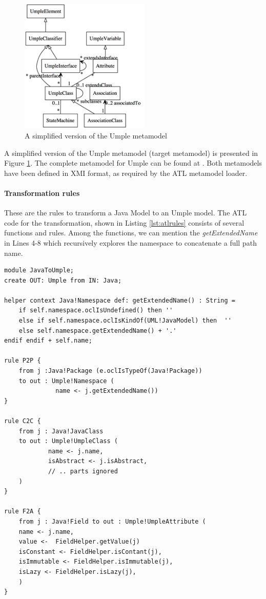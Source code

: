 \begin{figure}[h!]
\centering
\includegraphics[width=0.55\textwidth]{Figures/umpleMetamodel.png} 
\caption{A simplified version of the Umple metamodel}
\label{fig:umplemodelatl}
\end{figure}
A simplified version of the Umple metamodel (target metamodel) is presented in Figure \ref{fig:umplemodelatl}. The complete metamodel for Umple can be found at \cite{UmpleMetamodel}. Both metamodels have been defined in XMI format, as required by the ATL metamodel loader.

\paragraph{Transformation rules} 

These are the rules to transform a Java Model to an Umple model. The ATL code for the transformation, shown in Listing \ref{lst:atlrules} consists of several functions and rules. Among the functions, we can mention the \textit{getExtendedName} in Lines 4-8 which recursively explores the namespace to concatenate a full path name.


\begin{lstlisting}[style=atl, label=lst:atlrules, caption=ATL Transformation rules]
module JavaToUmple;
create OUT: Umple from IN: Java;

helper context Java!Namespace def: getExtendedName() : String = 
	if self.namespace.oclIsUndefined() then '' 	
	else if self.namespace.oclIsKindOf(UML!JavaModel) then 	'' 
	else self.namespace.getExtendedName() + '.'
endif endif + self.name;

rule P2P { 
	from j :Java!Package (e.oclIsTypeOf(Java!Package)) 	
	to out : Umple!Namespace ( 		
			  name <- j.getExtendedName())
}

rule C2C { 	
	from j : Java!JavaClass 	
	to out : Umple!UmpleClass ( 	
			name <- j.name, 	
			isAbstract <- j.isAbstract,      
			// .. parts ignored		
	)
}

rule F2A { 	
	from j : Java!Field to out : Umple!UmpleAttribute ( 		
	name <- j.name,
	value <-  FieldHelper.getValue(j) 	
	isConstant <- FieldHelper.isContant(j), 		
	isImmutable <- FieldHelper.isImmutable(j), 		
	isLazy <- FieldHelper.isLazy(j),
	)
}

\end{lstlisting}

